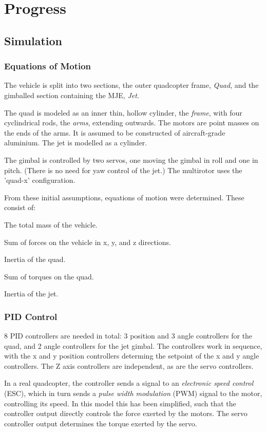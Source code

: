 \documentclass[11pt]{article}
\begin{document}
\section{Progress}
\subsection{Simulation}
\subsubsection{Equations of Motion}
The vehicle is split into two sections, the outer quadcopter frame, \emph{Quad}, and the gimballed section containing the MJE, \emph{Jet}.

The quad is modeled as an inner thin, hollow cylinder, the \emph{frame}, with four cyclindrical rods, the \emph{arms}, extending outwards. The motors are point masses on the ends of the arms. It is assumed to be constructed of aircraft-grade aluminium. The jet is modelled as a cylinder.

The gimbal is controlled by two servos, one moving the gimbal in roll and one in pitch. (There is no need for yaw control of the jet.) The multirotor uses the 'quad-x' configuration.

From these initial assumptions, equations of motion were determined. These consist of:
\begin{compactenum}
    \item The total mass of the vehicle.
    \item Sum of forces on the vehicle in x, y, and z directions.
    \item Inertia of the quad.
    \item Sum of torques on the quad.
    \item Inertia of the jet.
\end{compactenum}

\subsubsection{PID Control}
8 PID controllers are needed in total: 3 position and 3 angle controllers for the quad, and 2 angle controllers for the jet gimbal. The controllers work in sequence, with the x and y position controllers determing the setpoint of the x and y angle controllers. The Z axis controllers are independent, as are the servo controllers.

In a real quadcopter, the controller sends a signal to an \emph{electronic speed control} (ESC), which in turn sends a \emph{pulse width modulation} (PWM) signal to the motor, controlling its speed. In this model this has been simplified, such that the controller output directly controls the force exerted by the motors. The servo controller output determines the torque exerted by the servo.
\end{document}
